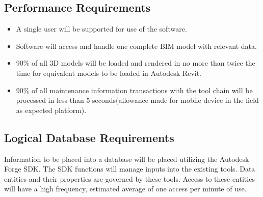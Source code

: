 \documentclass[onecolumn, draftclsnofoot,10pt, compsoc]{IEEEtran}
\begin{document}
    \subsection{Performance Requirements}
       \begin{itemize}
           \item A single user will be supported for use of the software.
           \item Software will access and handle one complete BIM model with relevant data.
           \item 90\% of all 3D models will be loaded and rendered in no more than twice the time for equivalent models to be loaded in Autodesk Revit.
           \item 90\% of all maintenance information transactions with the tool chain will be processed in less than 5 seconds(allowance made for mobile device in the field as expected platform).
       \end{itemize}
       
    \subsection{Logical Database Requirements}
        Information to be placed into a database will be placed utilizing the Autodesk Forge SDK. The SDK functions will manage inputs into the existing tools. Data entities and their properties are governed by these tools. Access to these entities will have a high frequency, estimated average of one access per minute of use.
\end{document}
